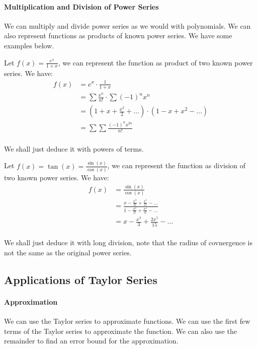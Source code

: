 \documentclass[11pt]{article}
\begin{document}
\paragraph{Multiplication and Division of Power Series} We can multiply and divide power series as we would with polynomials. We can also represent functions as products of known power series. We have some examples below.
\begin{example}
    Let $f(x) = \frac{e^x}{1+x}$, we can represent the function as product of two known power series. We have:
    \begin{align*}
        f(x) &= e^x \cdot \frac{1}{1+x} \\
        &= \sum \frac{x^n}{n!} \cdot \sum (-1)^n x^n \\
        &= (1 + x + \frac{x^2}{2} + \ldots) \cdot (1 - x + x^2 - \ldots) \\
        &= \sum \sum \frac{(-1)^n x^{2n}}{n!}
    \end{align*}
\end{example}
\paragraph{} We shall just deduce it with powers of terms.
\begin{example}
    Let $f(x) = \tan(x) = \frac{\sin(x)}{\cos(x)}$, we can represent the function as division of two known power series. We have:
    \begin{align*}
        f(x) &= \frac{\sin(x)}{\cos(x)} \\
        &= \frac{x - \frac{x^3}{3!} + \frac{x^5}{5!} - \ldots}{1 - \frac{x^2}{2!} + \frac{x^4}{4!} - \ldots} \\
        &= x - \frac{x^3}{3} + \frac{2x^5}{15} - \ldots
    \end{align*}
\end{example}
\paragraph{} We shall just deduce it with long division, note that the radius of covnergence is not the same as the original power series.
\subsection{Applications of Taylor Series}
\paragraph{Approximation} We can use the Taylor series to approximate functions. We can use the first few terms of the Taylor series to approximate the function. We can also use the remainder to find an error bound for the approximation.
\end{document}
